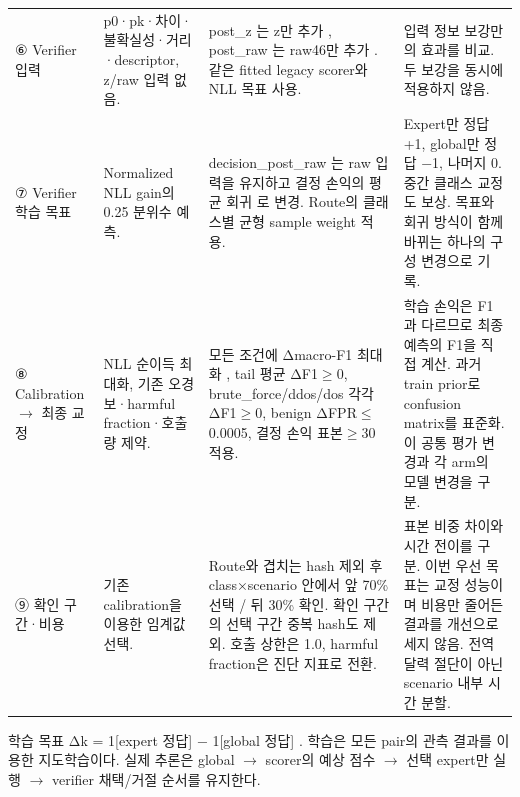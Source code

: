\begin{longtable}
{}⑥ Verifier 입력 & p0·pk·차이·불확실성·거리·descriptor, z/\allowbreak{}raw 입력 없음. & post\_\allowbreak{}z 는 z만 추가 , post\_\allowbreak{}raw 는 raw46만 추가 . 같은 fitted legacy scorer와 NLL 목표 사용. & 입력 정보 보강만의 효과를 비교. 두 보강을 동시에 적용하지 않음. \\
{}⑦ Verifier 학습 목표 & Normalized NLL gain의 0.25 분위수 예측. & decision\_\allowbreak{}post\_\allowbreak{}raw 는 raw 입력을 유지하고 결정 손익의 평균 회귀 로 변경. Route의 클래스별 균형 sample weight 적용. & Expert만 정답 +\allowbreak{}1, global만 정답 −1, 나머지 0. 중간 클래스 교정도 보상. 목표와 회귀 방식이 함께 바뀌는 하나의 구성 변경으로 기록. \\
{}⑧ Calibration  \ensuremath{\rightarrow}  최종 교정 & NLL 순이득 최대화, 기존 오경보·harmful fraction·호출량 제약. & 모든 조건에 Δmacro-F1 최대화 , tail 평균 ΔF1\ensuremath{\geq}0, brute\_\allowbreak{}force/\allowbreak{}ddos/\allowbreak{}dos 각각 ΔF1\ensuremath{\geq}0, benign ΔFPR\ensuremath{\leq}0.0005, 결정 손익 표본\ensuremath{\geq}30 적용. & 학습 손익은 F1과 다르므로 최종 예측의 F1을 직접 계산. 과거 train prior로 confusion matrix를 표준화. 이 공통 평가 변경과 각 arm의 모델 변경을 구분. \\
{}⑨ 확인 구간·비용 & 기존 calibration을 이용한 임계값 선택. & Route와 겹치는 hash 제외 후 class×scenario 안에서 앞 70\% 선택 /\allowbreak{} 뒤 30\% 확인. 확인 구간의 선택 구간 중복 hash도 제외. 호출 상한은 1.0, harmful fraction은 진단 지표로 전환. & 표본 비중 차이와 시간 전이를 구분. 이번 우선 목표는 교정 성능이며 비용만 줄어든 결과를 개선으로 세지 않음. 전역 달력 절단이 아닌 scenario 내부 시간 분할. \\
\bottomrule
\end{longtable}
\endgroup
학습 목표 Δk =\allowbreak{} 1[expert 정답] − 1[global 정답] . 학습은 모든 pair의 관측 결과를 이용한 지도학습이다. 실제 추론은 global  \ensuremath{\rightarrow}  scorer의 예상 점수  \ensuremath{\rightarrow}  선택 expert만 실행  \ensuremath{\rightarrow}  verifier 채택/\allowbreak{}거절 순서를 유지한다.

